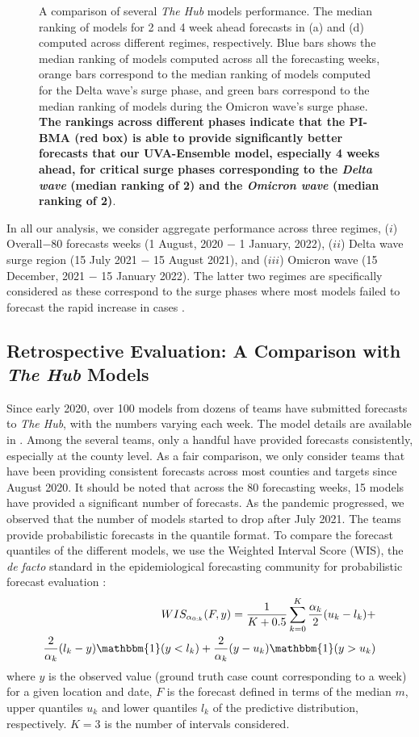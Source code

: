 \documentclass[conference,compsoc]{IEEEtran}
\newcommand{\hub}{\emph{The Hub}}
\begin{document}
\begin{figure}[ht!]
\begin{subfigure}{.5\textwidth}
    \end{subfigure}
        \caption{A comparison of several \hub{} models performance. The median ranking of models for 2 and 4 week ahead forecasts in (a) and (d) computed across different regimes, respectively. Blue bars shows the median ranking of models computed across all the forecasting weeks, orange bars correspond to the median ranking of models computed for the Delta wave's surge phase, and green bars correspond to the median ranking of models during the Omicron wave's surge phase. \textbf{The rankings across different phases indicate that the PI-BMA (red box) is able to provide significantly better forecasts that our UVA-Ensemble model, especially 4 weeks ahead, for critical surge phases corresponding to the \emph{Delta wave} (\textbf{median ranking of 2}) and the \emph{Omicron wave} (\textbf{median ranking of 2})}.  }
\label{fig:match_frac}
\end{figure}
In all our analysis, we consider aggregate performance across three regimes, ($i$) Overall$-$80 forecasts weeks (1 August, 2020 $-$ 1 January, 2022), ($ii$) Delta wave surge region (15 July 2021 $-$ 15 August 2021), and ($iii$) Omicron wave (15 December, 2021 $-$ 15 January 2022). The latter two regimes are specifically considered as these correspond to the surge phases where most models failed to forecast the rapid increase in cases \cite{ray2021challenges}.
\subsection{Retrospective Evaluation: A Comparison with \hub{} Models}\label{sec:comp_hub}
Since early 2020, over 100 models from dozens of teams have submitted forecasts to \hub{}, with the numbers varying each week. The model details are available in \cite{COVID-Hub}. Among the several teams, only a handful have provided forecasts consistently, especially at the county level. As a fair comparison, we only consider teams that have been providing consistent forecasts across most counties and targets since August 2020. It should be noted that across the 80 forecasting weeks, 15 models have provided a significant number of forecasts. As the pandemic progressed, we observed that the number of models started to drop after July 2021. The teams provide probabilistic forecasts in the quantile format. To compare the forecast quantiles of the different models, we use the Weighted Interval Score (WIS), the \emph{de facto} standard in the epidemiological forecasting community for probabilistic forecast evaluation \cite{bracher2020evaluating}:
\begin{align}
    WIS_{\alpha_{0:k}} (F,y) = \frac{1}{K+0.5} \sum_{k=0}^{K} \frac{\alpha_k}{2} (u_k-l_k) + \nonumber\\ \frac{2}{\alpha_k} (l_k-y) \mathbbm{1}(y<l_k) + \frac{2}{\alpha_k} (y-u_k) \mathbbm{1}(y>u_k)
    \label{eq:wis}
\end{align}
where $y$ is the observed value (ground truth case count corresponding to a week) for a given location and date, $F$ is the forecast defined in terms of the median $m$, upper quantiles $u_k$ and lower quantiles $l_k$ of the predictive distribution, respectively. $K=3$ is the number of intervals considered. 
\end{document}
